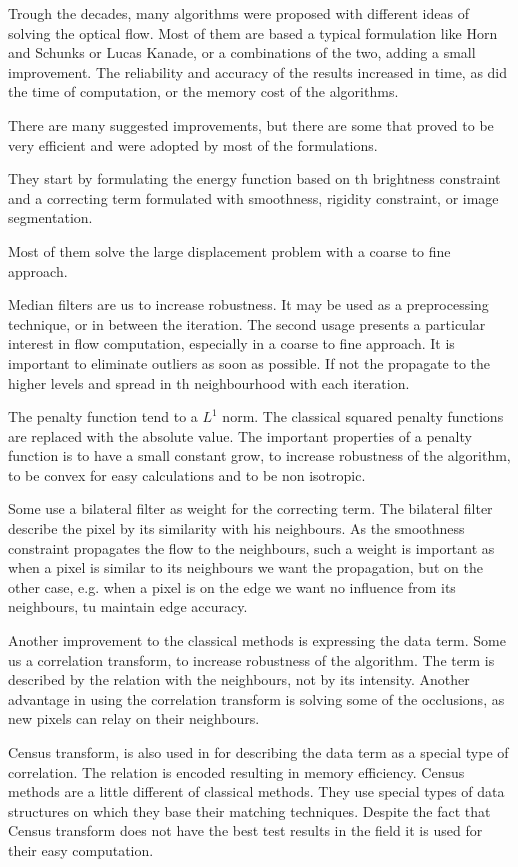 \documentclass[12pt,a4paper,twoside]{report}
\begin{document}
Trough the decades, many algorithms were proposed with different ideas of solving the optical flow. Most of them are based a typical formulation like Horn and Schunks or Lucas Kanade, or a combinations of the two, adding a small improvement. The reliability and  accuracy of the results increased in time, as did the time of computation, or the memory cost of the algorithms. 

There are many suggested improvements, but there are some that proved to be very efficient and were adopted by most of the formulations.

They start by formulating the energy function based on th brightness constraint and a correcting term formulated with smoothness, rigidity constraint,  or image segmentation. 

Most of them solve the large displacement problem with a coarse to fine approach.

Median filters are us to increase robustness. It may be used as a preprocessing technique, or in between the iteration. The second usage presents a particular interest in flow computation, especially in a coarse to fine approach. It is important to eliminate outliers as soon as possible. If not the propagate to the higher levels and spread in th neighbourhood with each iteration.

The penalty function tend to a $L^1$ norm. The classical squared penalty functions are replaced with the absolute value. The important properties of a penalty function is to have a small constant grow, to increase robustness of the algorithm, to be convex for easy calculations and to be non isotropic.

Some use a bilateral filter as weight for the correcting term. The bilateral filter describe the pixel by its similarity with his neighbours. As the smoothness constraint propagates the flow to the neighbours, such a weight is important as when a pixel is similar to its neighbours we want the propagation, but on the other case, e.g. when a pixel is on the edge we want no influence from its neighbours, tu maintain edge accuracy. 

Another improvement to the classical methods is expressing the data term. Some us a correlation transform, to increase robustness of the algorithm. The term is described by the relation with the neighbours, not by its intensity. Another advantage in using the correlation transform is solving some of the occlusions, as new pixels can relay on their neighbours.

Census transform, \cite{stein2004efficient} is also used in for describing the data term as a special type of correlation. The relation is encoded resulting in memory efficiency. Census methods are a little different of classical methods. They use special types of data structures on which they base their matching techniques. Despite the fact that Census transform does not have the best test results in the field it is used for their easy computation.
\end{document}

